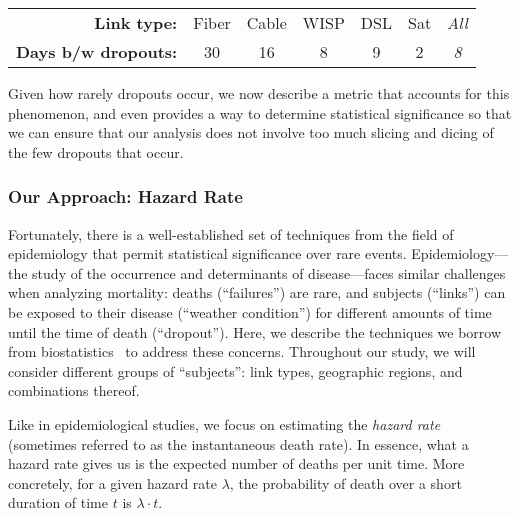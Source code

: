 \vspace{0.2cm}
\noindent
\begin{small}
	\begin{tabular}{@{~~}r@{~}c@{~}|@{~}c@{~}|@{~}c@{~}|@{~}c@{~}|@{~}c@{~}|@{~}c@{~}}
  \textbf{Link type:}    & Fiber & Cable & WISP & DSL & Sat & \textit{All} \\
  \textbf{Days b/w dropouts:} &   30  &   16  &    8 &   9 &   2 & \textit{8}   \\
\end{tabular}
\end{small}
\vspace{0.2cm}

Given how rarely dropouts occur, we now describe a metric that accounts for
this phenomenon, and even provides a way to determine statistical significance
so that we can ensure that our analysis does not involve too much slicing and
dicing of the few dropouts that occur.


\subsubsection*{Our Approach: Hazard Rate}
%
Fortunately, there is a well-established set of techniques from the
field of epidemiology that permit statistical significance over rare
events.
%
Epidemiology---the study of the occurrence and determinants of
disease---faces similar challenges when analyzing mortality: deaths
(``failures'') are rare, and subjects (``links'') can be exposed to
their disease (``weather condition'') for different amounts of time
until the time of death (``dropout'').
%
Here, we describe the techniques we borrow from
biostatistics~\cite{biostats-book} to address these concerns.
%
Throughout our study, we will consider different groups of ``subjects'':
link types, geographic regions, and combinations thereof.

Like in epidemiological studies, we focus on estimating the \emph{hazard rate}
(sometimes referred to as the instantaneous death rate).
%
In essence, what a hazard rate gives us is the expected number of deaths per
unit time.
%
More concretely, for a given hazard rate $\lambda$, the probability of death
over a short duration of time $t$ is $\lambda \cdot t$.


